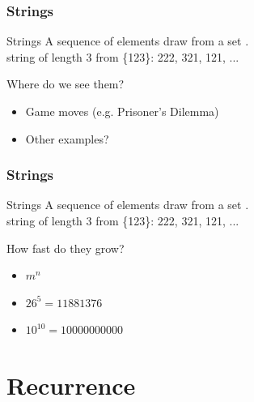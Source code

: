 \documentclass{beamer}
\begin{document}
\begin{frame}
  \frametitle{Strings}
  \begin{block}{Strings}
    A sequence of elements draw from a set .\\
    string of length 3 from \{123\}: 222, 321, 121, ...
  \end{block}
  \vfill

  \begin{block}{Where do we see them?}    
    \begin{itemize}
    \item Game moves (e.g. Prisoner's Dilemma)
    \item Other examples?
    \end{itemize}
  \end{block}
\end{frame}

\begin{frame}
  \frametitle{Strings}
  \begin{block}{Strings}
    A sequence of elements draw from a set .\\
    string of length 3 from \{123\}: 222, 321, 121, ...
  \end{block}
  \vfill

  \begin{block}{How fast do they grow?}
    \begin{itemize}
    \item<2> $m^n$
    \item<2> $26^5 = 11 881 376$
    \item<2> $10^{10} = 10 000 000 000$
    \end{itemize}
  \end{block}
\end{frame}

\section{Recurrence}
\end{document}
